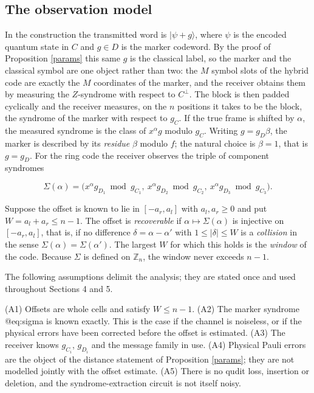 \documentclass[11pt,reqno]{amsart}
\theoremstyle{definition}
\theoremstyle{remark}
\newcommand{\Z}{\mathbb{Z}}
\begin{document}
\subsection{The observation model}

In the construction the transmitted word is $|\psi+g\rangle$, where $\psi$ is the encoded quantum state in $C$ and $g\in D$ is the marker codeword. By the proof of Proposition \ref{params} this same $g$ is the classical label, so the marker and the classical symbol are one object rather than two: the $M$ symbol slots of the hybrid code are exactly the $M$ coordinates of the marker, and the receiver obtains them by measuring the $Z$-syndrome with respect to $C^\perp$. The block is then padded cyclically and the receiver measures, on the $n$ positions it takes to be the block, the syndrome of the marker with respect to $g_C$. If the true frame is shifted by $\alpha$, the measured syndrome is the class of $x^\alpha g$ modulo $g_C$. Writing $g=g_D\beta$, the marker is described by its \emph{residue} $\beta$ modulo $f$; the natural choice is $\beta=1$, that is $g=g_D$. For the ring code the receiver observes the triple of component syndromes


\begin{equation}\label{eq:sigma}
\Sigma(\alpha)=\bigl(x^\alpha g_{D_1}\bmod g_{C_1},\ x^\alpha g_{D_2}\bmod g_{C_2},\ x^\alpha g_{D_3}\bmod g_{C_3}\bigr).
\end{equation}

Suppose the offset is known to lie in $[-a_r,a_l]$ with $a_l,a_r\ge0$ and put $W=a_l+a_r\le n-1$. The offset is \emph{recoverable} if $\alpha\mapsto\Sigma(\alpha)$ is injective on $[-a_r,a_l]$, that is, if no difference $\delta=\alpha-\alpha'$ with $1\le|\delta|\le W$ is a \emph{collision} in the sense $\Sigma(\alpha)=\Sigma(\alpha')$. The largest $W$ for which this holds is the \emph{window} of the code. Because $\Sigma$ is defined on $\Z_n$, the window never exceeds $n-1$.


The following assumptions delimit the analysis; they are stated once and used throughout Sections 4 and 5.


(A1) Offsets are whole cells and satisfy $W\le n-1$. (A2) The marker syndrome @eq:sigma is known exactly. This is the case if the channel is noiseless, or if the physical errors have been corrected before the offset is estimated. (A3) The receiver knows $g_{C_i}$, $g_{D_i}$ and the message family in use. (A4) Physical Pauli errors are the object of the distance statement of Proposition \ref{params}; they are not modelled jointly with the offset estimate. (A5) There is no qudit loss, insertion or deletion, and the syndrome-extraction circuit is not itself noisy.
\end{document}
